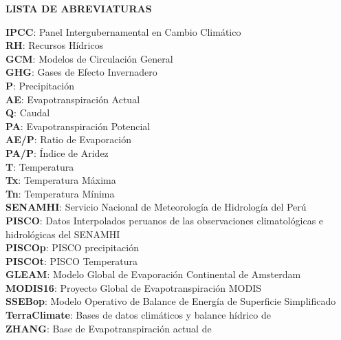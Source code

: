 \documentclass[12pt]{article}
\begin{document}
	

\clearpage

\tableofcontents
\clearpage
\listoffigures
\clearpage
\listoftables
\clearpage
\listofappendices
\clearpage

\begin{center}
\large{\textbf {LISTA DE ABREVIATURAS}}
\end{center}

\textbf{IPCC}: Panel Intergubernamental en Cambio Climático \\
\textbf{RH}: Recursos Hídricos \\
\textbf{GCM}: Modelos de Circulación General \\
\textbf{GHG}: Gases de Efecto Invernadero \\
\textbf{P}: Precipitación \\
\textbf{AE}: Evapotranspiración Actual \\
\textbf{Q}: Caudal \\
\textbf{PA}: Evapotranspiración Potencial \\
\textbf{AE/P}: Ratio de Evaporación \\
\textbf{PA/P}: Índice de Aridez \\
\textbf{T}: Temperatura \\
\textbf{Tx}: Temperatura Máxima \\
\textbf{Tn}: Temperatura Mínima \\
\textbf{SENAMHI}: Servicio Nacional de Meteorología de Hidrología del Perú \\
\textbf{PISCO}: Datos Interpolados peruanos de las observaciones climatológicas e hidrológicas del SENAMHI \\
\textbf{PISCOp}: PISCO precipitación \\
\textbf{PISCOt}: PISCO Temperatura \\
\textbf{GLEAM}: Modelo Global de Evaporación Continental de Amsterdam \citep{Martens2017} \\
\textbf{MODIS16}: Proyecto Global de Evapotranspiración MODIS \citep{mu2013modis} \\
\textbf{SSEBop}: Modelo Operativo de Balance de Energía de Superficie Simplificado \\
\textbf{TerraClimate}: Bases de datos climáticos y balance hídrico de \citet{abatzoglou2018terraclimate}\\
\textbf{ZHANG}: Base de Evapotranspiración actual de \citet{zhang2015vegetation} \\
\end{document}
